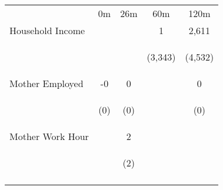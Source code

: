 \begin{tabular}{lcccc}
\hline \noalign{\smallskip} & 0m & 26m & 60m & 120m\\
\noalign{\smallskip}\hline \noalign{\smallskip}Household Income &  &  & 1 & 2,611\\
 & \begin{footnotesize}\end{footnotesize} & \begin{footnotesize}\end{footnotesize} & \begin{footnotesize}(3,343)\end{footnotesize} & \begin{footnotesize}(4,532)\end{footnotesize}\\
\noalign{\smallskip}Mother Employed & -0 & 0 &  & 0\\
 & \begin{footnotesize}(0)\end{footnotesize} & \begin{footnotesize}(0)\end{footnotesize} & \begin{footnotesize}\end{footnotesize} & \begin{footnotesize}(0)\end{footnotesize}\\
\noalign{\smallskip}Mother Work Hour &  & 2 &  & \\
 & \begin{footnotesize}\end{footnotesize} & \begin{footnotesize}(2)\end{footnotesize} & \begin{footnotesize}\end{footnotesize} & \begin{footnotesize}\end{footnotesize}\\
\noalign{\smallskip}\hline\end{tabular}\\
